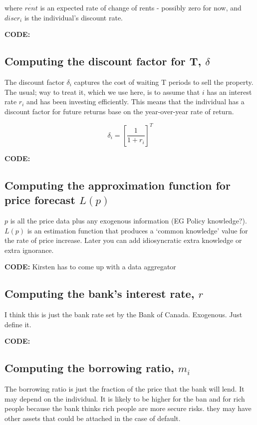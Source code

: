 where $\dot{rent}$ is an expected rate of change of rents - possibly zero for now, and $discr_i$ is the individual's discount rate.



\textbf{CODE:}  

\subsection{Computing the discount factor for T, $\delta$}
The discount factor $\delta_i$ captures the cost of waiting T periods to sell the property. The usual; way to treat it, which we use here, is to assume that $i$ has an interest rate $r_i$ and has been investing efficiently. This means that  the individual has a discount factor for future returns base on the year-over-year rate of return. 

\[\delta_i=\left[\frac{1}{1+r_i}\right]^T\]

\textbf{CODE:}  
\subsection{Computing the approximation function for price forecast $L(p)$}
$p$ is all the price data plus any exogenous information (EG Policy knowledge?). $L(p)$ is an estimation function that produces a `common knowledge' value for the rate of price increase. Later you can add idiosyncratic extra knowledge or extra ignorance.

\textbf{CODE:}  Kirsten has to come up with a data aggregator 



\subsection{Computing the bank's interest rate, $r$}

I think this is just the bank rate set by the Bank of Canada. Exogenous. Just define it.

\textbf{CODE:}  

\subsection{Computing the borrowing ratio, $m_i$}
The borrowing ratio is just the fraction of the price that the bank will lend. It may depend on the individual. It is likely to be higher for the ban and for rich people because the bank thinks rich people are more secure risks. they may have other assets that could be attached in the case of default.


